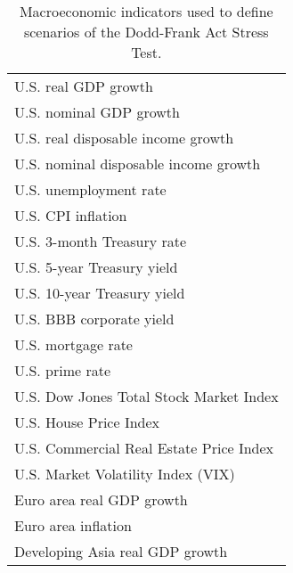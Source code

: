 \documentclass[letter, 12pt]{article}
\begin{document}
\begin{table}[ht]

\centering

\caption{Macroeconomic indicators used to define scenarios of the Dodd-Frank Act Stress Test.}

\label{table:DFAST}

\begin{tabular}{l}

\\

\hline

U.S. real GDP growth \\

U.S. nominal GDP growth \\

U.S. real disposable income growth \\

U.S. nominal disposable income growth \\

U.S. unemployment rate \\

U.S. CPI inflation \\

U.S. 3-month Treasury rate \\

U.S. 5-year Treasury yield \\

U.S. 10-year Treasury yield \\

U.S. BBB corporate yield \\

U.S. mortgage rate \\

U.S. prime rate \\

U.S. Dow Jones Total Stock Market Index\\

U.S. House Price Index \\

U.S. Commercial Real Estate Price Index\\

U.S. Market Volatility Index (VIX) \\

Euro area real GDP growth \\

Euro area inflation \\

Developing Asia real GDP growth \\


\end{tabular}
\end{table}
\end{document}
